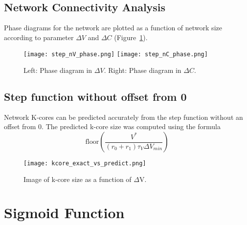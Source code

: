 \documentclass[11pt,letterpaper]{article}
\begin{document}
\subsection*{Network Connectivity Analysis}
Phase diagrams for the network are plotted as a function of network size according to parameter $\Delta V$ and $\Delta C$ (Figure~\ref{fig:step_function_phase_diagrams}).

\begin{figure}[h!]
  \centering
  	\texttt{[image: step\_nV\_phase.png]}
    \texttt{[image: step\_nC\_phase.png]}
  \caption{Left: Phase diagram in $\Delta V$. Right: Phase diagram in $\Delta C$.}
  \label{fig:step_function_phase_diagrams}
\end{figure}

\subsection*{Step function without offset from 0}
Network K-cores can be predicted accurately from the step function without an offset from 0. The predicted k-core size was computed using the formula
$$\text{floor}(\frac{V^*}{(r_0 + r_1)\tau _V \Delta V_{min}})$$

\begin{figure}[h!]
  \centering
    \texttt{[image: kcore\_exact\_vs\_predict.png]}
  \caption{Image of k-core size as a function of $\Delta$V.}
  \label{fig:kcore_exact_vs_predict}
\end{figure}

\section*{Sigmoid Function}
\end{document}
